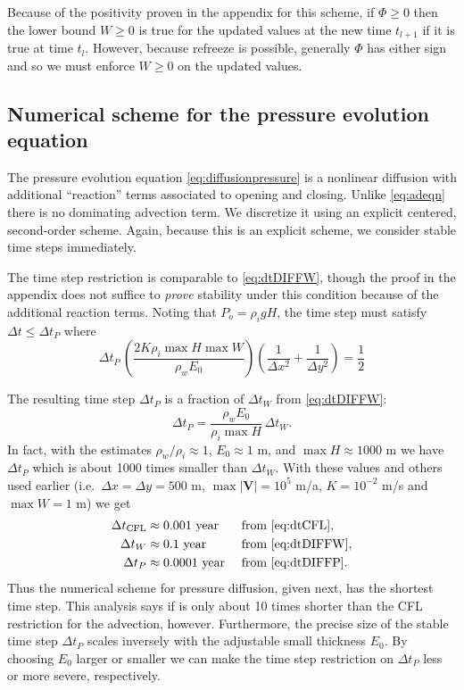 \documentclass[11pt,final]{amsart}%
\newcommand\bV{\mathbf{V}}
\begin{document}
Because of the positivity proven in the appendix for this scheme, if $\Phi\ge 0$ then the lower bound $W\ge 0$ is true for the updated values at the new time $t_{l+1}$ if it is true at time $t_l$.  However, because refreeze is possible, generally $\Phi$ has either sign and so we must enforce $W\ge 0$ on the updated values.

\subsection*{Numerical scheme for the pressure evolution equation}  The pressure evolution equation \eqref{eq:diffusionpressure} is a nonlinear diffusion with additional ``reaction'' terms associated to opening and closing.  Unlike \eqref{eq:adeqn} there is no dominating advection term.  We discretize it using an explicit centered, second-order scheme.  Again, because this is an explicit scheme, we consider stable time steps immediately.

The time step restriction is comparable to \eqref{eq:dtDIFFW}, though the proof in the appendix does not suffice to \emph{prove} stability under this condition because of the additional reaction terms.  Noting that $P_o=\rho_i g H$, the time step must satisfy $\Delta t \le \Delta t_P$ where
\begin{equation}
\Delta t_P\, \left(\frac{2 K \rho_i \max H \max W}{\rho_w E_0}\right) \left(\frac{1}{\Delta x^2} + \frac{1}{\Delta y^2}\right) = \frac{1}{2} \label{eq:dtDIFFP}
\end{equation}

The resulting time step $\Delta t_P$ is a fraction of $\Delta t_W$ from \eqref{eq:dtDIFFW}:
\begin{equation}
\Delta t_P = \frac{\rho_w E_0}{\rho_i \max H}\, \Delta t_W.
\end{equation}
In fact, with the estimates $\rho_w/\rho_i \approx 1$, $E_0\approx 1$ m, and $\max H \approx 1000$ m we have $\Delta t_P$ which is about 1000 times smaller than $\Delta t_W$.  With these values and others used earlier (i.e.~$\Delta x = \Delta y = 500$ m, $\max |\bV|=10^5$ m/a, $K=10^{-2}$ m/s and $\max W=1$ m) we get
\begin{align*}
  \Delta t_{\text{CFL}} &\approx 0.001  \text{ year} &&\text{ from \eqref{eq:dtCFL}}, \\
  \Delta t_W            &\approx 0.1    \text{ year} &&\text{ from \eqref{eq:dtDIFFW}}, \\
  \Delta t_P            &\approx 0.0001 \text{ year} &&\text{ from \eqref{eq:dtDIFFP}.}
\end{align*}
Thus the numerical scheme for pressure diffusion, given next, has the shortest time step.  This analysis says if is only about 10 times shorter than the CFL restriction for the advection, however.  Furthermore, the precise size of the stable time step $\Delta t_P$ scales inversely with the adjustable small thickness $E_0$.  By choosing $E_0$ larger or smaller we can make the time step restriction on $\Delta t_P$ less or more severe, respectively.
\end{document}
